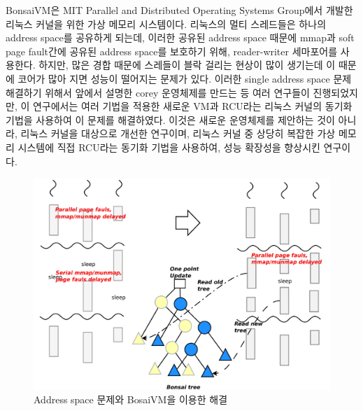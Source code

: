 BonsaiVM은 MIT Parallel and Distributed Operating Systems Group에서 개발한 리눅스 커널을 위한 
가상 메모리 시스템이다. 
리눅스의 멀티 스레드들은 하나의 address space를 공유하게 되는데, 이러한 공유된 address space 때문에 
mmap과 soft page fault간에 공유된 address space를 보호하기 위해, reader-writer 세마포어를 사용한다. 
하지만, 많은 경합 때문에 스레들이 블락 걸리는 현상이 많이 생기는데 이 때문에 코어가 많아 지면 성능이 떨어지는 
문제가 있다. 
이러한 single address space 문제해결하기 위해서 앞에서 설명한 corey 운영체제를 만드는 등 여러 연구들이 
진행되었지만, 이 연구에서는 여러 기법을 적용한 새로운 VM과 RCU라는 리눅스 커널의 동기화 기법을 사용하여 
이 문제를 해결하였다. 
이것은 새로운 운영체제를 제안하는 것이 아니라, 리눅스 커널을 대상으로 개선한 연구이며, 리눅스 커널 중 상당히 
복잡한 가상 메모리 시스템에 직접 RCU라는 동기화 기법을 사용하여, 성능 확장성을 향상시킨 연구이다.
 
 \begin{figure}[h!]
    \centering
    \includegraphics[width=1\textwidth]{fig/bosaivm/bosaivm}
    \caption{Address space 문제와 BosaiVM을 이용한 해결}
  \label{fig:bosaivm}
\end{figure}
 
